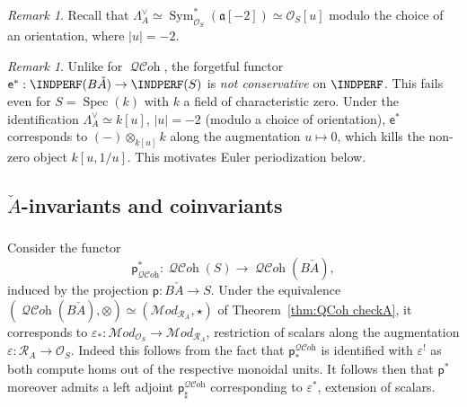 \documentclass[12pt, oneside]{amsart}
\numberwithin{equation}{section}
\theoremstyle{remark}
\newtheorem{remark}[subsubsection]{Remark}
\theoremstyle{plain}
\newcommand{\MOD}{\mathcal{M}\textit{od}}
\DeclareMathOperator{\QCOH}{\mathcal{QC}\textit{oh}}
\newcommand{\R}{\mathcal{R}}
\newcommand{\RA}{\R_A}
\newcommand{\fra}{\mathfrak{a}}
\newcommand{\lamco}{\Lambda^\vee}
\newcommand{\OO}{\mathcal{O}}
\DeclareMathOperator{\spc}{Spec}
\DeclareMathOperator{\Sym}{Sym}
\newcommand{\eps}{\varepsilon}
\newcommand{\sfp}{\mathsf{p}}
\newcommand{\sfe}{\mathsf{e}}
\begin{document}
\begin{remark}
  Recall that $\lamco_A \simeq \Sym^*_{\OO_S}(\fra[-2]) \simeq \OO_S[u]$ modulo the choice of an orientation, where $|u| = -2$.
\end{remark}

\begin{remark}\label{rem:pi not conservative}
  Unlike for $\QCOH$, the forgetful functor $\sfe^*: \INDPERF(B\check{A}) \rightarrow \INDPERF(S)$ is \emph{not conservative} on $\INDPERF$.
  This fails even for $S=\spc(k)$ with $k$ a field of characteristic zero.
  Under the identification $\lamco_A \simeq k[u]$, $|u|=-2$ (modulo a choice of orientation), $\sfe^*$ corresponds to $(-) \otimes_{k[u]} k$ along the augmentation $u \mapsto 0$, which kills the non-zero object $k[u, 1/u]$. This motivates Euler periodization below.
\end{remark}

\subsection{\texorpdfstring{$\check{A}$}{Ǎ}-invariants and coinvariants}\label{ssec:checkA invariants}

\subsubsection{}

Consider the functor $$\sfp^*_{\QCOH} : \QCOH(S) \to \QCOH(B\check{A}),$$ induced by the projection $\sfp : B\check{A} \to S$.
Under the equivalence $(\QCOH(B\check{A}), \otimes) \simeq (\MOD_{\RA}, \star)$ of Theorem~\ref{thm:QCoh checkA}, it corresponds to $\eps_* : \MOD_{\OO_S} \to \MOD_{\RA}$, restriction of scalars along the augmentation $\eps : \RA \to \OO_S$.
Indeed this follows from the fact that $\sfp_*^{\QCOH}$ is identified with $\eps^!$ as both compute homs out of the respective monoidal units. It follows then that $\sfp^*$ moreover admits a left adjoint $\sfp_{\sharp}^{\QCOH}$ corresponding to $\eps^*$, extension of scalars.

\subsubsection{}\label{sssec:sfp push}
\end{document}
